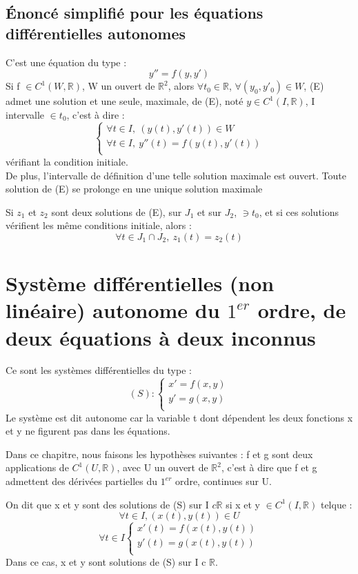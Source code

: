 \subsection{Énoncé simplifié pour les équations différentielles autonomes}
C'est une équation du type : 
$$y'' = f(y,y')$$
Si f $\in C^1(W,\mathbb{R})$, W un ouvert de $\mathbb{R}^2$, alors $\forall t_0 \in \mathbb{R}$, $\forall (y_0,y'_0) \in W$, (E) admet une solution et une seule, maximale, de (E), noté $y \in C^1(I,\mathbb{R})$, I intervalle $\in t_0$, c'est à dire :
$$\begin{cases}
   \forall t \in I,~ (y(t),y'(t)) \in W \\
   \forall t \in I,~ y''(t) = f(y(t),y'(t))\\
  \end{cases}
$$
vérifiant la condition initiale.\\
De plus, l'intervalle de définition d'une telle solution maximale est ouvert. Toute solution de (E) se prolonge en une unique solution maximale
\begin{coro}
Si $z_1$ et $z_2$ sont deux solutions de (E), sur $J_1$ et sur $J_2$, $\ni t_0$, et si ces solutions vérifient les même conditions initiale, alors : 
$$\forall t \in J_1\cap J_2,~ z_1(t) = z_2(t)$$
\end{coro}
\section{Système différentielles (non linéaire) autonome du $1^{er}$ ordre, de deux équations à deux inconnus}
\begin{de}
Ce sont les systèmes différentielles du type : 
$$(S) : \begin{cases}
    x' = f(x,y) \\
    y' = g(x,y) \\
  \end{cases}
$$
Le système est dit autonome car la variable t dont dépendent les deux fonctions x et y ne figurent pas dans les équations.
\end{de}
Dans ce chapitre, nous faisons les hypothèses suivantes : f et g sont deux applications de $C^1(U,\mathbb{R})$, avec U un ouvert de $\mathbb{R}^2$, c'est à dire que f et g admettent des dérivées partielles du $1^{er}$ ordre, continues sur U.
\begin{de}
On dit que x et y sont des solutions de (S) sur I $c \mathbb{R}$ si x et y $\in C^1(I,\mathbb{R})$ telque : 
$$\forall t \in I, (x(t),y(t)) \in U$$
$$\forall t \in I \begin{cases}
                   x'(t) = f(x(t),y(t)) \\
		   y'(t) = g(x(t),y(t)) \\
                  \end{cases}
$$
Dans ce cas, x et y sont solutions de (S) sur I c $\mathbb{R}$.
\end{de}
